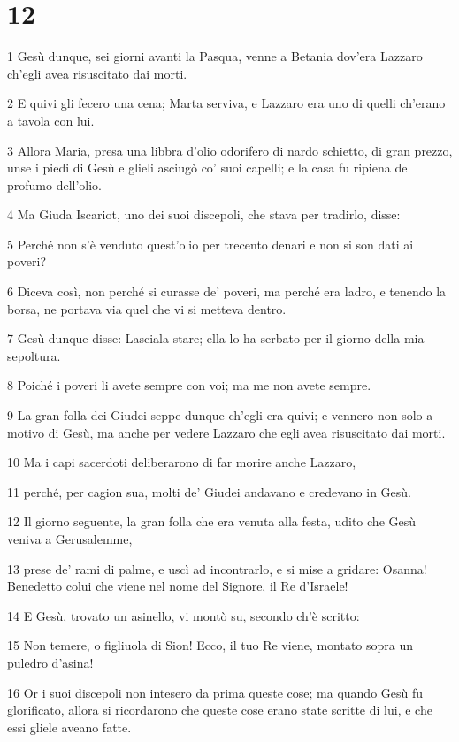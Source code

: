\chapter{12}

\par 1 Gesù dunque, sei giorni avanti la Pasqua, venne a Betania dov'era Lazzaro ch'egli avea risuscitato dai morti.
\par 2 E quivi gli fecero una cena; Marta serviva, e Lazzaro era uno di quelli ch'erano a tavola con lui.
\par 3 Allora Maria, presa una libbra d'olio odorifero di nardo schietto, di gran prezzo, unse i piedi di Gesù e glieli asciugò co' suoi capelli; e la casa fu ripiena del profumo dell'olio.
\par 4 Ma Giuda Iscariot, uno dei suoi discepoli, che stava per tradirlo, disse:
\par 5 Perché non s'è venduto quest'olio per trecento denari e non si son dati ai poveri?
\par 6 Diceva così, non perché si curasse de' poveri, ma perché era ladro, e tenendo la borsa, ne portava via quel che vi si metteva dentro.
\par 7 Gesù dunque disse: Lasciala stare; ella lo ha serbato per il giorno della mia sepoltura.
\par 8 Poiché i poveri li avete sempre con voi; ma me non avete sempre.
\par 9 La gran folla dei Giudei seppe dunque ch'egli era quivi; e vennero non solo a motivo di Gesù, ma anche per vedere Lazzaro che egli avea risuscitato dai morti.
\par 10 Ma i capi sacerdoti deliberarono di far morire anche Lazzaro,
\par 11 perché, per cagion sua, molti de' Giudei andavano e credevano in Gesù.
\par 12 Il giorno seguente, la gran folla che era venuta alla festa, udito che Gesù veniva a Gerusalemme,
\par 13 prese de' rami di palme, e uscì ad incontrarlo, e si mise a gridare: Osanna! Benedetto colui che viene nel nome del Signore, il Re d'Israele!
\par 14 E Gesù, trovato un asinello, vi montò su, secondo ch'è scritto:
\par 15 Non temere, o figliuola di Sion! Ecco, il tuo Re viene, montato sopra un puledro d'asina!
\par 16 Or i suoi discepoli non intesero da prima queste cose; ma quando Gesù fu glorificato, allora si ricordarono che queste cose erano state scritte di lui, e che essi gliele aveano fatte.
